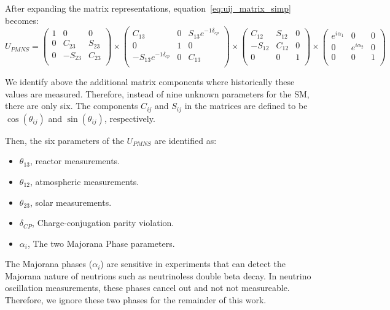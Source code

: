 After expanding the matrix representations, equation~\ref{eq:uij_matrix_simp} becomes:
\begin{equation}
U_{PMNS}
=
\begin{pmatrix}
1 & 0 & 0 \\
0 & C_{23} & S_{23} \\
0 & -S_{23} & C_{23} \\
\end{pmatrix}
\times
\begin{pmatrix}
C_{13} & 0 & S_{13}e^{-1\delta_{cp}} \\
0 & 1 & 0 \\
-S_{13}e^{-1\delta_{cp}} & 0 & C_{13} \\
\end{pmatrix}
\times
\begin{pmatrix}
C_{12} & S_{12} & 0 \\
-S_{12} & C_{12} & 0 \\
0 & 0 & 1 \\
\end{pmatrix}
\times
\begin{pmatrix}
e^{i\alpha_{1}} & 0 & 0 \\
0 & e^{i\alpha_{2}} & 0 \\
0 & 0 & 1 \\
\end{pmatrix}
\end{equation}

We identify above the additional matrix components where historically these values are measured.
Therefore, instead of nine unknown parameters for the SM, there are only six.
The components $C_{ij}$ and $S_{ij}$ in the matrices are defined to be $\cos(\theta_{ij})$ and $\sin(\theta_{ij})$, respectively.

Then, the six parameters of the $U_{PMNS}$ are identified as:

\begin{itemize}
    \item $\theta_{13}$, reactor measurements.
    \item $\theta_{12}$, atmospheric measurements.
    \item $\theta_{23}$, solar measurements.
    \item $\delta_{CP}$, Charge-conjugation parity violation.
    \item $\alpha_{i}$, The two Majorana Phase parameters.
\end{itemize}

The Majorana phases ($\alpha_{i}$) are sensitive in experiments that can detect the Majorana nature of neutrions such as neutrinoless double beta decay.
In neutrino oscillation measurements, these phases cancel out and not not measureable.
Therefore, we ignore these two phases for the remainder of this work.


